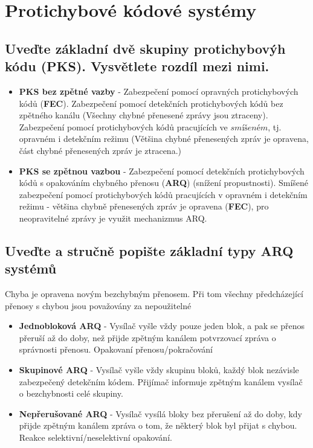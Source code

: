 \clearpage
\section{Protichybové kódové systémy}
\subsection{Uveďte základní dvě skupiny protichybovýh kódu (PKS). Vysvětlete rozdíl mezi nimi.}
\begin{itemize}
    \item \textbf{PKS bez zpětné vazby} - Zabezpečení pomocí opravných protichybových kódů (\textbf{FEC}). Zabezpečení pomocí detekčních protichybových kódů bez zpětného kanálu (Všechny chybné přenesené zprávy jsou ztraceny). Zabezpečení pomocí protichybových kódů pracujících ve $smíšeném$, tj. opravném i detekčním režimu (Většina chybné přenesených zpráv je opravena, část chybné přenesených zpráv je ztracena.)
    \item \textbf{PKS se zpětnou vazbou} - Zabezpečení pomocí detekčních  protichybových kódů s opakováním chybného přenosu (\textbf{ARQ}) (snížení propustnosti). Smíšené zabezpečení pomocí protichybových kódů pracujících v opravném i detekčním režimu - většina chybně přenesených zpráv je opravena (\textbf{FEC}), pro neopravitelné zprávy je využit mechanizmus ARQ.
\end{itemize}

\subsection{Uveďte a stručně popište základní typy ARQ systémů}
Chyba je opravena novým bezchybným přenosem. Při tom všechny předcházející přenosy s chybou jsou považovány za nepoužitelné
\begin{itemize}
    \item \textbf{Jednobloková ARQ} - Vysílač vyšle vždy pouze jeden blok, a pak se přenos přeruší až do doby, než přijde zpětným kanálem potvrzovací zpráva o správnosti přenosu. Opakovaní přenosu/pokračování
    \item \textbf{Skupinové ARQ} - Vysílač vyšle vždy skupinu bloků, každý blok nezávisle zabezpečený detekčním kódem. Přijímač informuje zpětným kanálem vysílač o bezchybnosti celé skupiny.
    \item \textbf{Nepřerušované ARQ} - Vysílač vysílá bloky bez přerušení až do doby, kdy přijde zpětným kanálem zpráva o tom, že některý blok byl přijat s chybou. Reakce selektivní/neselektivní opakování.
\end{itemize}
